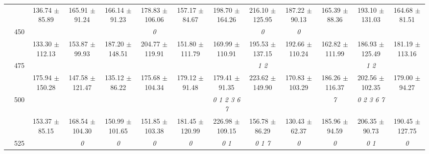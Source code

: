 \begin{table}[h]
{\begin{tabular}{
        ccccccccccccc}
 & & \cellcolor[HTML]{EFEFEF} 136.74 $\pm$ 85.89& \cellcolor[HTML]{EFEFEF} 165.91 $\pm$ 91.24& \cellcolor[HTML]{EFEFEF} 166.14 $\pm$ 91.23& \cellcolor[HTML]{EFEFEF} 178.83 $\pm$ 106.06& \cellcolor[HTML]{EFEFEF} 157.17 $\pm$ 84.67& \cellcolor[HTML]{EFEFEF} 198.70 $\pm$ 164.26& \cellcolor[HTML]{EFEFEF} 216.10 $\pm$ 125.95& \cellcolor[HTML]{EFEFEF} 187.22 $\pm$ 90.13& \cellcolor[HTML]{EFEFEF} 165.39 $\pm$ 88.36& \cellcolor[HTML]{EFEFEF} 193.10 $\pm$ 131.03& \cellcolor[HTML]{EFEFEF} 164.68 $\pm$ 81.51 \\ 
 & \multirow{2}{*}{450}& & & & \textit{ 0 }& & & \textit{ 0 }& \textit{ 0 }& & &  \\ 
 & & 133.30 $\pm$ 112.13& 153.87 $\pm$ 99.93& 187.20 $\pm$ 148.51& 204.77 $\pm$ 119.91& 151.80 $\pm$ 111.79& 169.99 $\pm$ 110.91& 195.53 $\pm$ 137.15& 192.66 $\pm$ 110.24& 162.82 $\pm$ 111.99& 186.93 $\pm$ 125.49& 181.19 $\pm$ 113.16 \\ 
 & \multirow{2}{*}{475}& \cellcolor[HTML]{EFEFEF} & \cellcolor[HTML]{EFEFEF} & \cellcolor[HTML]{EFEFEF} & \cellcolor[HTML]{EFEFEF} & \cellcolor[HTML]{EFEFEF} & \cellcolor[HTML]{EFEFEF} & \cellcolor[HTML]{EFEFEF} \textit{ 1 2 }& \cellcolor[HTML]{EFEFEF} & \cellcolor[HTML]{EFEFEF} & \cellcolor[HTML]{EFEFEF} \textit{ 1 2 }& \cellcolor[HTML]{EFEFEF}  \\ 
 & & \cellcolor[HTML]{EFEFEF} 175.94 $\pm$ 150.28& \cellcolor[HTML]{EFEFEF} 147.58 $\pm$ 121.47& \cellcolor[HTML]{EFEFEF} 135.12 $\pm$ 86.22& \cellcolor[HTML]{EFEFEF} 175.68 $\pm$ 104.34& \cellcolor[HTML]{EFEFEF} 179.12 $\pm$ 91.48& \cellcolor[HTML]{EFEFEF} 179.41 $\pm$ 91.35& \cellcolor[HTML]{EFEFEF} 223.62 $\pm$ 149.90& \cellcolor[HTML]{EFEFEF} 170.83 $\pm$ 103.29& \cellcolor[HTML]{EFEFEF} 186.26 $\pm$ 116.37& \cellcolor[HTML]{EFEFEF} 202.56 $\pm$ 102.35& \cellcolor[HTML]{EFEFEF} 179.00 $\pm$ 94.27 \\ 
 & \multirow{2}{*}{500}& & & & & & \textit{ 0 1 2 3 6 7 }& & & \textit{ 7 }& \textit{ 0 2 3 6 7 }&  \\ 
 & & 153.37 $\pm$ 85.15& 168.54 $\pm$ 104.30& 150.99 $\pm$ 101.65& 151.85 $\pm$ 103.38& 181.45 $\pm$ 120.99& 226.98 $\pm$ 109.15& 156.78 $\pm$ 86.29& 130.43 $\pm$ 62.37& 185.96 $\pm$ 94.59& 206.35 $\pm$ 90.73& 190.45 $\pm$ 127.75 \\ 
 & \multirow{2}{*}{525}& \cellcolor[HTML]{EFEFEF} & \cellcolor[HTML]{EFEFEF} \textit{ 0 }& \cellcolor[HTML]{EFEFEF} \textit{ 0 }& \cellcolor[HTML]{EFEFEF} \textit{ 0 }& \cellcolor[HTML]{EFEFEF} \textit{ 0 }& \cellcolor[HTML]{EFEFEF} \textit{ 0 1 }& \cellcolor[HTML]{EFEFEF} \textit{ 0 1 7 }& \cellcolor[HTML]{EFEFEF} \textit{ 0 }& \cellcolor[HTML]{EFEFEF} \textit{ 0 }& \cellcolor[HTML]{EFEFEF} \textit{ 0 1 }& \cellcolor[HTML]{EFEFEF} \textit{ 0 } \\ 

\end{tabular}}
\end{table}
